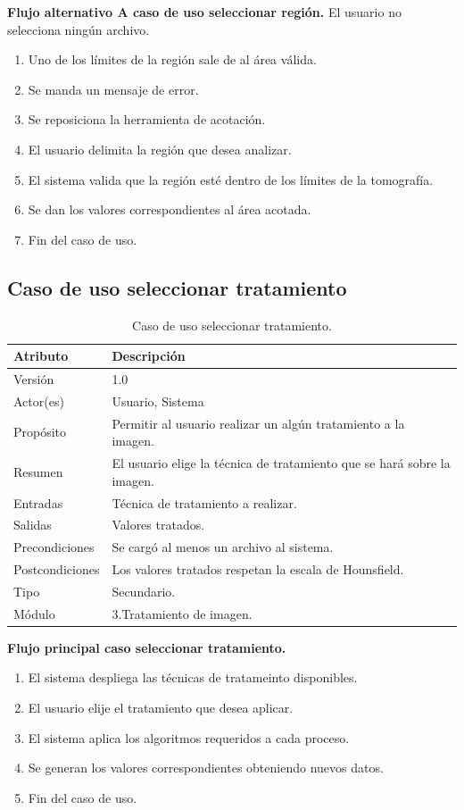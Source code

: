 \documentclass[12pt]{report}
\begin{document}
\textbf{Flujo alternativo A caso de uso seleccionar región. }
El usuario no selecciona ningún archivo.
\begin{enumerate}[{A}1{.}]
\item Uno de los límites de la región sale de al área válida.
\item Se manda un mensaje de error.
\item Se reposiciona la herramienta de acotación.
\item El usuario delimita la región que desea analizar.
\item El sistema valida que la región esté dentro de los límites de la tomografía.
\item Se dan los valores correspondientes al área acotada.
\item Fin del caso de uso.
\end{enumerate}

\subsection{Caso de uso seleccionar tratamiento}
\begin{table}[H]
\begin{center}
\begin{tabular}{p{30mm}p{80mm}}
\hline
Atributo & Descripción\\
\hline \hline 
Versión & 1.0\\
Actor(es) & Usuario, Sistema\\
Propósito & Permitir al usuario realizar un algún tratamiento a la imagen.\\
Resumen & El usuario elige la técnica de tratamiento que se hará sobre la imagen.\\
Entradas & Técnica de tratamiento a realizar.\\
Salidas & Valores tratados.\\
Precondiciones & Se cargó al menos un archivo al sistema.\\
Postcondiciones & Los valores tratados respetan la escala de Hounsfield.\\
Tipo & Secundario.\\
Módulo & 3.Tratamiento de imagen.\\
\hline \hline 
\end{tabular}
\caption{Caso de uso seleccionar tratamiento.}
\end{center}
\end{table}

\textbf{Flujo principal caso seleccionar tratamiento. }
\begin{enumerate}
\item El sistema despliega las técnicas de tratameinto disponibles.
\item El usuario elije el tratamiento que desea aplicar.
\item El sistema aplica los algoritmos requeridos a cada proceso.
\item Se generan los valores correspondientes obteniendo nuevos datos.
\item Fin del caso de uso.
\end{enumerate}
\end{document}
